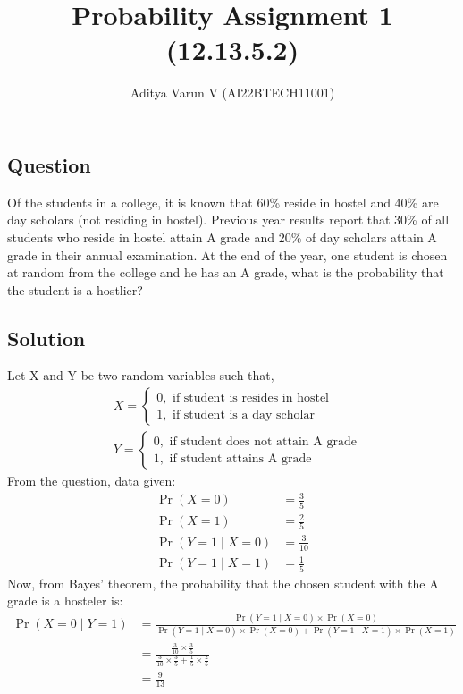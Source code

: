 \documentclass[12pt,onecolumn,notitlepage]{article}
\title{Probability Assignment 1 (12.13.5.2)}
\author{Aditya Varun V (AI22BTECH11001)}
\date{}
\providecommand{\pr}[1]{\ensuremath{\Pr\left(#1\right)}}
\begin{document}
\maketitle
\subsection*{Question}
Of the students in a college, it is known that 60\% reside in hostel and 40\% are
day scholars (not residing in hostel). Previous year results report that 30\% of all
students who reside in hostel attain A grade and 20\% of day scholars attain A
grade in their annual examination. At the end of the year, one student is chosen
at random from the college and he has an A grade, what is the probability that the
student is a hostlier?


\subsection*{Solution}

Let X and Y be two random variables such that,
\begin{align}
 & X =  \begin{cases}
     0, \text{ if student is resides in hostel}\\
     1, \text{ if student is a day scholar} 
 \end{cases}\\
 & Y =  \begin{cases}
     0, \text{ if student does not attain A grade}\\
     1, \text{ if student attains A grade} 
 \end{cases}
\end{align}
From the question, data given:
\begin{align}
	\pr{X=0} &= \frac{3}{5}\\
	\pr{X=1} &= \frac{2}{5}\\
	\pr{Y=1 \mid X=0} &= \frac{3}{10}\\
	\pr{Y=1 \mid X=1} &= \frac{1}{5}
\end{align}
Now, from Bayes' theorem, the probability that the chosen student with the A grade is a hosteler is:
 \begin{align}
 	\pr{X=0 \mid Y=1} &= \frac{\pr{Y=1 \mid X=0}\times\pr{X=0}}{\pr{Y=1 \mid X=0}\times\pr{X=0} + \pr{Y=1 \mid X=1}\times\pr{X=1}}\\
 	&= \frac{\frac{3}{10}\times\frac{3}{5}}{\frac{3}{10}\times\frac{3}{5} + \frac{1}{5}\times\frac{2}{5}}\\
 	&= \frac{9}{13}
 \end{align}
\end{document}
